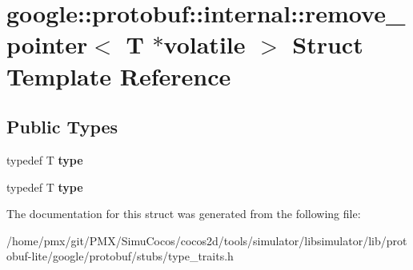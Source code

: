 \hypertarget{structgoogle_1_1protobuf_1_1internal_1_1remove__pointer_3_01T_01_5volatile_01_4}{}\section{google\+:\+:protobuf\+:\+:internal\+:\+:remove\+\_\+pointer$<$ T $\ast$volatile $>$ Struct Template Reference}
\label{structgoogle_1_1protobuf_1_1internal_1_1remove__pointer_3_01T_01_5volatile_01_4}
\subsection*{Public Types}
\begin{DoxyCompactItemize}
\item 
\mbox{\label{structgoogle_1_1protobuf_1_1internal_1_1remove__pointer_3_01T_01_5volatile_01_4_a7af8d90abbaae9af32e778ccde6cd333}} 
typedef T {\bfseries type}
\item 
\mbox{\label{structgoogle_1_1protobuf_1_1internal_1_1remove__pointer_3_01T_01_5volatile_01_4_a7af8d90abbaae9af32e778ccde6cd333}} 
typedef T {\bfseries type}
\end{DoxyCompactItemize}


The documentation for this struct was generated from the following file\+:\begin{DoxyCompactItemize}
\item 
/home/pmx/git/\+P\+M\+X/\+Simu\+Cocos/cocos2d/tools/simulator/libsimulator/lib/protobuf-\/lite/google/protobuf/stubs/type\+\_\+traits.\+h\end{DoxyCompactItemize}
